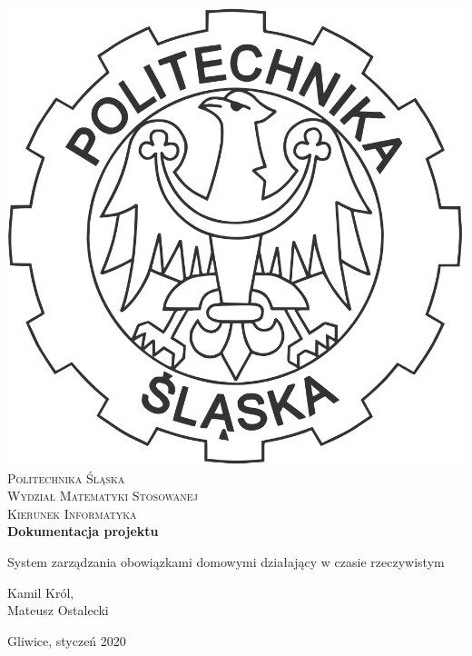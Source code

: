 \documentclass[12pt,a4paper]{article}  %
\begin{document}
	\thispagestyle{empty}
	
		\begin{center}
			
			\centering
\includegraphics[keepaspectratio,scale=0.1]{./img/godlo.PNG} \\[.8cm]

			{\fontsize{17}{17}\selectfont
				\textsc{Politechnika Śląska \\[.3cm]
					Wydział Matematyki Stosowanej  \\[.3cm]
					Kierunek Informatyka  \\[2.5cm]}
				\textbf{Dokumentacja projektu \\[1.7cm]}}
			
			
			
			\large 
			{System zarządzania obowiązkami domowymi działający 
			w czasie rzeczywistym } \\[3.cm]

			
			\large
			\begin{flushleft}
				 Kamil Król, \\
			        Mateusz Ostalecki
			\end{flushleft}
			
			\vspace{3cm}
			Gliwice, styczeń 2020
		\end{center}
\end{document}
